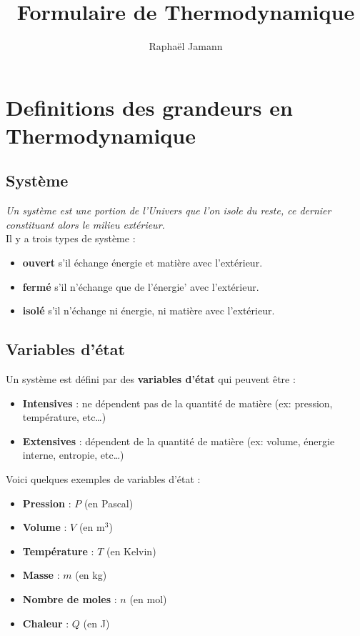 \documentclass[a4paper,12pt]{article}
\title{Formulaire de Thermodynamique}
\author{Raphaël Jamann}
\date{}
\begin{document}
\maketitle


\section{Definitions des grandeurs en Thermodynamique}

\begin{multicols}{2}

\subsection*{Système}

\textit{Un système est une portion de l'Univers que l'on isole du reste,
ce dernier constituant alors le milieu extérieur.}\\
Il y a trois types de système :
\begin{itemize}[label=\textbullet]
    \item \textbf{ouvert} s'il échange énergie et matière avec l'extérieur.
    \item \textbf{fermé} s'il n'échange que de l'énergie' avec l'extérieur.
    \item \textbf{isolé} s'il n'échange ni énergie, ni matière avec l'extérieur.
\end{itemize}

\subsection*{Variables d'état}
Un système est défini par des \textbf{variables d'état} qui peuvent être :
\begin{itemize}[label=\textbullet]
    \item \textbf{Intensives} : ne dépendent pas de la quantité de matière (ex: pression, température, etc\dots)
    \item \textbf{Extensives} : dépendent de la quantité de matière (ex: volume, énergie interne, entropie, etc\dots)
\end{itemize}

\noindent Voici quelques exemples de variables d'état :
\begin{itemize}[label=\textbullet]
    \item \textbf{Pression} : $P$ (en Pascal)
    \item \textbf{Volume} : $V$ (en m$^3$)
    \item \textbf{Température} : $T$ (en Kelvin)
    \item \textbf{Masse} : $m$ (en kg)
    \item \textbf{Nombre de moles} : $n$ (en mol)
    \item \textbf{Chaleur} : $Q$ (en J)
\end{itemize}


\end{multicols}
\end{document}
